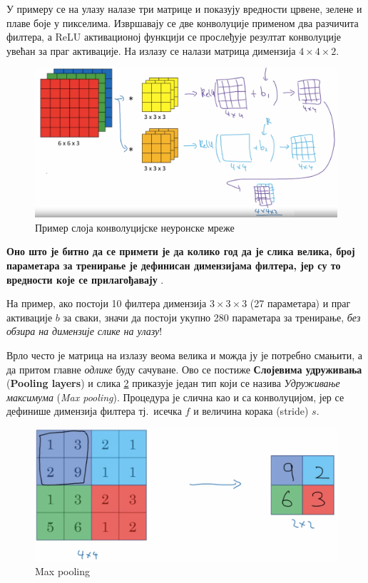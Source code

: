 \documentclass[12pt, а4paper]{article}
\begin{document}
У примеру се на улазу налазе три матрице и показују вредности
црвене, зелене и плаве боје у пикселима. Извршавају се две конволуције
применом два разчичита филтера, а ReLU активационој функцији се прослеђује
резултат конволуције увећан за праг активације.
На излазу се налази матрица димензија $4 \times 4 \times 2$.

\begin{figure}[H]
  \centering
      \includegraphics[scale=0.35]{slike/ngConvLay1.png}
  \caption{Пример слоја конволуцијске неуронске мреже}
  \label{fig:ng_ConvLay1}
\end{figure}

\textbf{Оно што је битно да се примети је да колико год да је слика велика,
број параметара за тренирање је дефинисан димензијама филтера, јер
су то вредности које се прилагођавају} \cite{ngConvOneLay}.

На пример, ако постоји 10 филтера димензија $3 \times 3 \times 3$
(27 параметара) и праг активације $b$ за сваки, значи да постоји укупно
280 параметара за тренирање, \textit{без обзира на димензије слике на улазу}!

Врло често је матрица на излазу веома велика и можда ју је потребно
смањити, а да притом главне \textit{одлике} буду сачуване.
Ово се постиже \textbf{Слојевима удруживања} (\textbf{Pooling layers}) и
слика \ref{fig:ng_MaxPool} приказује један тип који се назива
\textit{Удруживање максимума} (\textit{Max pooling}). Процедура је слична као
и са конволуцијом, јер се дефинише димензија филтера тј.\ исечка $f$ и величина
корака (stride) $s$.

\begin{figure}[H]
  \centering
      \includegraphics[scale=0.3]{slike/ngMaxPool.png}
  \caption{Max pooling}
  \label{fig:ng_MaxPool}
\end{figure}
\end{document}
